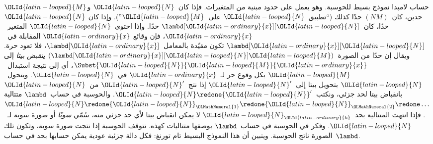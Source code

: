 \documentclass[../../../include/open-logic-section]{subfiles}
\begin{document}


حساب لامبدا نموذج بسيط للحوسبة. وهو يعمل على حدود مبنية من المتغيرات. فإذا
كان~${\OLId{latin-looped}{N}}$ و${\OLId{latin-looped}{M}}$ حدين، كان~$(NM)$ حدًا كذلك (``تطبيق~${\OLId{latin-looped}{N}}$ على~${\OLId{latin-looped}{M}}$''). وإذا كان
${\OLId{latin-looped}{N}}$ حدًا، كان~$\lambd[{\OLId{latin-ordinary}{x}}][{\OLId{latin-looped}{N}}]$ حدًا. وإذا احتوى~${\OLId{latin-looped}{N}}$ المتغير~${\OLId{latin-ordinary}{x}}$، فإن وقائع
${\OLId{latin-ordinary}{x}}$ المقابلة في~$\lambd[{\OLId{latin-ordinary}{x}}][{\OLId{latin-looped}{N}}]$ تكون مقيّدة بالمعامل~$\lambd[{\OLId{latin-ordinary}{x}}]$، فلا تعود
حرة. ويقال إن حدًا من الصورة~$(\lambd[{\OLId{latin-ordinary}{x}}][{\OLId{latin-looped}{N}}]{\OLId{latin-looped}{M}})$ \emph{ينقبض بيتا} إلى
$\Subst{{\OLId{latin-looped}{N}}}{{\OLId{latin-looped}{M}}}{{\OLId{latin-ordinary}{x}}}$، أي إلى نتيجة استبدال~${\OLId{latin-looped}{M}}$ بكل وقوع حر لـ~${\OLId{latin-ordinary}{x}}$ في~${\OLId{latin-looped}{N}}$.
ويتحول~${\OLId{latin-looped}{N}}$ بتحويل بيتا إلى~${\OLId{latin-looped}{N}}'$ إذا نتج~${\OLId{latin-looped}{N}}'$ من~${\OLId{latin-looped}{N}}$ بانقباض بيتا لحد جزئي،
ونكتب~${\OLId{latin-looped}{N}}\redone {\OLId{latin-looped}{N}}'$. والحوسبة في حساب~$\lambd$ متتالية
${\OLId{latin-looped}{N}}\redone {\OLId{latin-looped}{N}}_{\OLMathNumeral{1}}\redone {\OLId{latin-looped}{N}}_{\OLMathNumeral{2}}\redone\dots$. فإذا انتهت المتتالية بحد~${\OLId{latin-looped}{N}}_{\OLId{latin-ordinary}{k}}$ لا
يمكن انقباض بيتا لأي حد جزئي منه، سُمّي \emph{سويًا} أو صورة سوية لـ~${\OLId{latin-looped}{N}}$.
وفكر في الحوسبة في حساب~$\lambd$ بوصفها متتاليات كهذه. تتوقف الحوسبة إذا
نتجت صورة سوية، وتكون تلك الصورة ناتج الحوسبة. ويتبين أن هذا النموذج البسيط
تام تورنغ: فكل دالة جزئية عودية يمكن حسابها بحد في حساب~$\lambd$.
\end{document}
